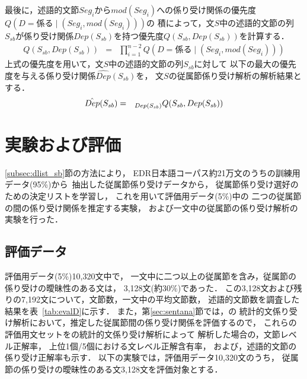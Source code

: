 最後に，述語的文節$Seg_i$から$mod(Seg_i)$への係り受け関係の優先度$Q(D\!=\!係る\mid (Seg_i,mod(Seg_i)))$の
積によって，文$S$中の述語的文節の列$S_{sb}$が\mbox{係り受け関係$Dep(S_{sb})$を持}つ優先度$Q(S_{sb},Dep(S_{sb}))$を計算する．
\begin{eqnarray*}
 Q(S_{sb},Dep(S_{sb}))	&  = &
	  \prod_{i=1}^{n-2}Q(D\!=\!係る\mid (Seg_i,mod(Seg_i))) 
\end{eqnarray*}
上式の優先度を用いて，文$S$中の述語的文節の列$S_{sb}$に対して
以下の最大の\mbox{優先度を与える係り}受け関係$\hat{Dep}(S_{sb})$を，
文$S$の従属節係り受け解析の解析結果とする．
\begin{eqnarray*}
  \hat{Dep}(S_{sb}) & = & _{Dep(S_{sb})}Q(S_{sb},Dep(S_{sb}))
\end{eqnarray*}


\section{実験および評価}

\ref{subsec:dlist_sb}節の方法により，
EDR日本語コーパス約21万文のうちの訓練用データ(95\%)\mbox{から
抽出し}た従属節係り受けデータから，
従属節係り受け選好のための決定リストを学習し，
これを用いて評価用データ(5\%)中の
二つの従属節の間の係り受け関係を推定する実験，
および一文中の従属節の係り受け解析の実験を行った．

\subsection{評価データ}

評価用データ(5\%)10,320文中で，
一文中に二つ以上の従属節を含み，従属節の係り受けの曖昧性のある文は，
3,128文(約30\%)であった．
この3,128文および残りの7,192文について，文節数，一文中の平均文節数，
述語的文節数を調査した結果を表~\ref{tab:evalD}に示す．
また，第\ref{sec:sentana}節では，\cite{Fujio97aj,Fujio99aj}の
統計的文係り受け解析において，推定した従属節間の係り受け関係を評価するので，
これらの評価用文セットを\cite{Fujio97aj,Fujio99aj}の統計的文係り受け解析によって
解析した場合の，文節レベル正解率，
上位1個/5個における文レベル正解含有率，
および，述語的文節の係り受け正解率も示す．
以下の実験では，評価用データ10,320文のうち，
従属節の係り受けの曖昧性のある文3,128文を評価対象とする．


